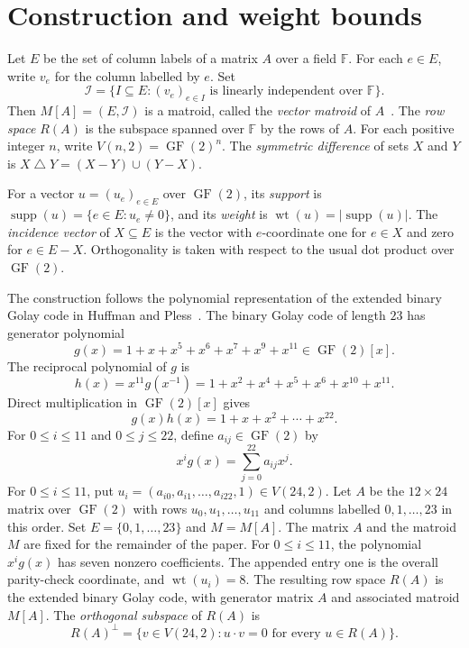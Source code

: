 \documentclass[11pt]{article}
\numberwithin{equation}{section}
\DeclareMathOperator{\GF}{GF}
\DeclareMathOperator{\supp}{supp}
\DeclareMathOperator{\wt}{wt}
\begin{document}
\section{Construction and weight bounds}

Let $E$ be the set of column labels of a matrix $A$ over a field $\mathbb{F}$.
For each $e\in E$, write $v_e$ for the column labelled by $e$.
Set
\[
 \mathcal I=\{I\subseteq E:(v_e)_{e\in I}
 \text{ is linearly independent over }\mathbb{F}\}.
\]
Then $M[A]=(E,\mathcal I)$ is a matroid, called the \emph{vector matroid}
of $A$~\cite[Proposition~1.1.1]{Oxley2011}.
The \emph{row space} $R(A)$ is the subspace spanned over $\mathbb{F}$ by the rows of $A$.
For each positive integer $n$, write $V(n,2)=\GF(2)^n$.
The \emph{symmetric difference} of sets $X$ and $Y$ is
$X\mathbin{\triangle}Y=(X-Y)\cup(Y-X)$.

For a vector $u=(u_e)_{e\in E}$ over $\GF(2)$, its \emph{support} is
$\supp(u)=\{e\in E:u_e\ne0\}$, and its \emph{weight} is
$\wt(u)=|\supp(u)|$.
The \emph{incidence vector} of $X\subseteq E$ is the vector with
$e$-coordinate one for $e\in X$ and zero for $e\in E-X$.
Orthogonality is taken with respect to the usual dot product over $\GF(2)$.

The construction follows the polynomial representation of the extended
binary Golay code in Huffman and Pless~\cite[Section~10.1.2]{HuffmanPless2003}.
The binary Golay code of length $23$ has generator polynomial
\begin{equation}\label{eq:g}
 g(x)=1+x+x^5+x^6+x^7+x^9+x^{11}\in\GF(2)[x].
\end{equation}
The reciprocal polynomial of $g$ is
\[
 h(x)=x^{11}g(x^{-1})=1+x^2+x^4+x^5+x^6+x^{10}+x^{11}.
\]
Direct multiplication in $\GF(2)[x]$ gives
\begin{equation}\label{eq:product}
 g(x)h(x)=1+x+x^2+\cdots+x^{22}.
\end{equation}
For $0\leq i\leq11$ and $0\leq j\leq22$, define $a_{ij}\in\GF(2)$ by
\begin{equation}\label{eq:row-coefficients}
 x^i g(x)=\sum_{j=0}^{22}a_{ij}x^j.
\end{equation}
For $0\leq i\leq11$, put
$u_i=(a_{i0},a_{i1},\ldots,a_{i22},1)\in V(24,2)$.
Let $A$ be the $12\times24$ matrix over $\GF(2)$ with rows
$u_0,u_1,\ldots,u_{11}$ and columns labelled $0,1,\ldots,23$ in this order.
Set $E=\{0,1,\ldots,23\}$ and $M=M[A]$.
The matrix $A$ and the matroid $M$ are fixed for the remainder of the paper.
For $0\leq i\leq11$, the polynomial $x^i g(x)$ has seven nonzero
coefficients. The appended entry one is the overall parity-check
coordinate, and $\wt(u_i)=8$.
The resulting row space $R(A)$ is the extended binary Golay code,
with generator matrix $A$ and associated matroid $M[A]$.
The \emph{orthogonal subspace} of $R(A)$ is
\[
 R(A)^\perp=\{v\in V(24,2):u\cdot v=0\text{ for every }u\in R(A)\}.
\]
\end{document}

